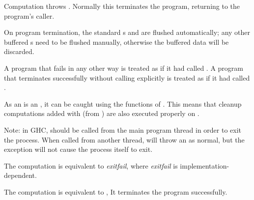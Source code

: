 \begin{haddockdesc}
\item[\begin{tabular}{@{}l}
exitWith :: ExitCode -> IO a
\end{tabular}]
{\haddockbegindoc
Computation   throws  .
 Normally this terminates the program, returning  to the
 program's caller.\par
On program termination, the standard s  and
  are flushed automatically; any other buffered s
 need to be flushed manually, otherwise the buffered data will be
 discarded.\par
A program that fails in any other way is treated as if it had
 called .
 A program that terminates successfully without calling 
 explicitly is treated as if it had called  .\par
As an  is an , it can be
 caught using the functions of .  This means that
 cleanup computations added with  (from
 ) are also executed properly on .\par
Note: in GHC,  should be called from the main program
 thread in order to exit the process.  When called from another
 thread,  will throw an  as normal, but the
 exception will not cause the process itself to exit.\par}
\end{haddockdesc}
\begin{haddockdesc}
\item[\begin{tabular}{@{}l}
exitFailure :: IO a
\end{tabular}]
{\haddockbegindoc
The computation  is equivalent to
  \haddocktt{(} \emph{exitfail}\haddocktt{)},
 where \emph{exitfail} is implementation-dependent.\par}
\end{haddockdesc}
\begin{haddockdesc}
\item[\begin{tabular}{@{}l}
exitSuccess :: IO a
\end{tabular}]
{\haddockbegindoc
The computation  is equivalent to
  , It terminates the program
 successfully.\par}
\end{haddockdesc}